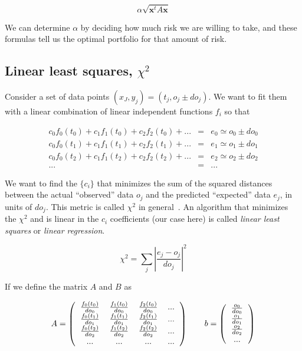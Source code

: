 \documentclass[justified,sixbynine]{tufte-book}
\theoremstyle{plain}%
\theoremstyle{definition}
\theoremstyle{remark}
\begin{document}
\begin{fullwidth}
\begin{equation}
\alpha \sqrt{\mathbf{x}^t A \mathbf{x}}
\end{equation}

We can determine $\alpha$ by deciding how much risk we are willing to take, and these formulas tell us the optimal portfolio for that amount of risk.


\goodbreak\subsection{Linear least squares, $\chi^2$}


Consider a set of data points $(x_J,y_j) = (t_j,o_j \pm do_j)$. We want to fit them with a linear combination of linear independent functions $f_i$ so that

\begin{eqnarray}
c_0 f_0(t_0) + c_1 f_1(t_0) + c_2 f_2(t_0) +  ... & = & e_0 \simeq o_0 \pm do_0\\
c_0 f_0(t_1) + c_1 f_1(t_1) + c_2 f_2(t_1) +  ... & = & e_1 \simeq o_1 \pm do_1\\
c_0 f_0(t_2) + c_1 f_1(t_2) + c_2 f_2(t_2) +  ... & = & e_2 \simeq o_2 \pm do_2\\
... &=& ...
\end{eqnarray}

We want to find the $\{c_i\}$ that minimizes the sum of the squared distances between the actual ``observed'' data $o_j$ and the predicted ``expected'' data $e_j$, in units of $do_j$. This metric is called $\chi^2$ in general~\cite{chi2}. An algorithm that minimizes the $\chi^2$  and is linear in the $c_i$ coefficients (our case here) is called {\it linear least squares} or {\it linear regression}.

\begin{equation}
\chi^2 = \sum_j \left|\frac{e_j - o_j}{do_j}\right|^2
\end{equation}

If we define the matrix $A$ and $B$ as

\begin{equation}
A=\left(
\begin{tabular}{cccc}
$\frac{f_0(t_0)}{do_0}$ & $\frac{f_1(t_0)}{do_0}$ & $\frac{f_2(t_0)}{do_0}$ &...\\
$\frac{f_0(t_1)}{do_1}$ & $\frac{f_1(t_1)}{do_1}$ & $\frac{f_2(t_1)}{do_1}$ &...\\
$\frac{f_0(t_2)}{do_2}$ & $\frac{f_1(t_2)}{do_2}$ & $\frac{f_2(t_2)}{do_2}$ &...\\
...& ...& ... & ...
\end{tabular}
\right) \qquad b =
\left(
\begin{tabular}{c}
$\frac{o_0}{do_0}$ \\
$\frac{o_1}{do_1}$ \\
$\frac{o_2}{do_2}$ \\
...
\end{tabular}
\right)
\end{equation}


\end{fullwidth}
\end{document}
